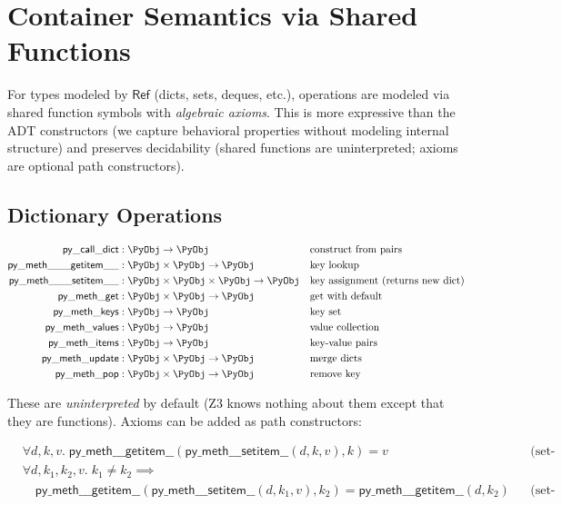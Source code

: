 \section{Container Semantics via Shared Functions}

For types modeled by $\mathsf{Ref}$ (dicts, sets, deques, etc.),
operations are modeled via shared function symbols with
\emph{algebraic axioms}.  This is more expressive than the ADT
constructors (we capture behavioral properties without modeling
internal structure) and preserves decidability (shared functions
are uninterpreted; axioms are optional path constructors).

\subsection{Dictionary Operations}

\begin{definition}
\begin{align}
  \mathsf{py\_call\_dict} &: \PyObj \to \PyObj
    && \text{construct from pairs} \\
  \mathsf{py\_meth\_\_\_getitem\_\_} &: \PyObj \times \PyObj \to \PyObj
    && \text{key lookup} \\
  \mathsf{py\_meth\_\_\_setitem\_\_} &: \PyObj \times \PyObj \times
    \PyObj \to \PyObj
    && \text{key assignment (returns new dict)} \\
  \mathsf{py\_meth\_get} &: \PyObj \times \PyObj \to \PyObj
    && \text{get with default} \\
  \mathsf{py\_meth\_keys} &: \PyObj \to \PyObj
    && \text{key set} \\
  \mathsf{py\_meth\_values} &: \PyObj \to \PyObj
    && \text{value collection} \\
  \mathsf{py\_meth\_items} &: \PyObj \to \PyObj
    && \text{key-value pairs} \\
  \mathsf{py\_meth\_update} &: \PyObj \times \PyObj \to \PyObj
    && \text{merge dicts} \\
  \mathsf{py\_meth\_pop} &: \PyObj \times \PyObj \to \PyObj
    && \text{remove key}
\end{align}
\end{definition}

These are \emph{uninterpreted} by default (Z3 knows nothing about
them except that they are functions).  Axioms can be added as path
constructors:

\begin{align}
  &\forall d, k, v.\; \mathsf{py\_meth\_\_\_getitem\_\_}(
    \mathsf{py\_meth\_\_\_setitem\_\_}(d, k, v), k) = v
    && \text{(set-then-get)} \\
  &\forall d, k_1, k_2, v.\; k_1 \neq k_2 \implies \nonumber \\
  &\quad \mathsf{py\_meth\_\_\_getitem\_\_}(
    \mathsf{py\_meth\_\_\_setitem\_\_}(d, k_1, v), k_2) =
    \mathsf{py\_meth\_\_\_getitem\_\_}(d, k_2)
    && \text{(set-then-get-other)}
\end{align}


